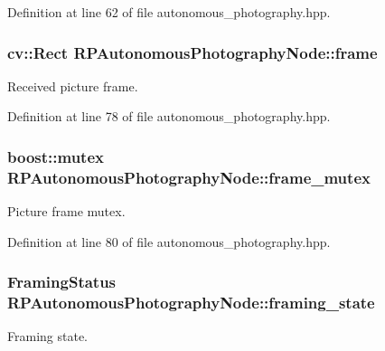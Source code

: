 \-Definition at line 62 of file autonomous\-\_\-photography.\-hpp.

\hypertarget{class_r_p_autonomous_photography_node_a796dec0abe6fc1728bd9577c2cea2116}{
\subsubsection[{frame}]{\setlength{\rightskip}{0pt plus 5cm}cv\-::\-Rect {\bf \-R\-P\-Autonomous\-Photography\-Node\-::frame}}}\label{class_r_p_autonomous_photography_node_a796dec0abe6fc1728bd9577c2cea2116}
\-Received picture frame. 

\-Definition at line 78 of file autonomous\-\_\-photography.\-hpp.

\hypertarget{class_r_p_autonomous_photography_node_a871a50679bc8d5792728f687de5f0817}{
\subsubsection[{frame\-\_\-mutex}]{\setlength{\rightskip}{0pt plus 5cm}boost\-::mutex {\bf \-R\-P\-Autonomous\-Photography\-Node\-::frame\-\_\-mutex}}}\label{class_r_p_autonomous_photography_node_a871a50679bc8d5792728f687de5f0817}
\-Picture frame mutex. 

\-Definition at line 80 of file autonomous\-\_\-photography.\-hpp.

\hypertarget{class_r_p_autonomous_photography_node_a8109c74e907e283cb06e66b4e9f3591f}{
\subsubsection[{framing\-\_\-state}]{\setlength{\rightskip}{0pt plus 5cm}\-Framing\-Status {\bf \-R\-P\-Autonomous\-Photography\-Node\-::framing\-\_\-state}}}\label{class_r_p_autonomous_photography_node_a8109c74e907e283cb06e66b4e9f3591f}
\-Framing state. 

